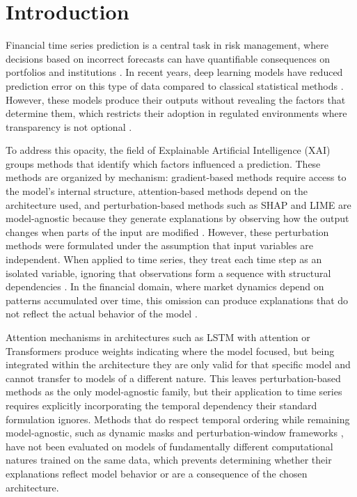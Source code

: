 \documentclass[runningheads]{llncs}
\begin{document}
\section{Introduction}
\label{sec:introduction}

Financial time series prediction is a central task in risk
management, where decisions based on incorrect forecasts can have
quantifiable consequences on portfolios and institutions
\cite{arsenault2025}. In recent years, deep learning models have
reduced prediction error on this type of data compared to classical
statistical methods \cite{bhandari2022,abdulquadir2023}. However,
these models produce their outputs without revealing the factors
that determine them, which restricts their adoption in regulated
environments where transparency is not optional \cite{arsenault2025}.

To address this opacity, the field of Explainable Artificial
Intelligence (XAI) groups methods that identify which factors
influenced a prediction. These methods are organized by mechanism:
gradient-based methods require access to the model's internal
structure, attention-based methods depend on the architecture used,
and perturbation-based methods such as SHAP and LIME are
model-agnostic because they generate explanations by observing how
the output changes when parts of the input are modified
\cite{arsenault2025}. However, these perturbation methods were
formulated under the assumption that input variables are
independent. When applied to time series, they treat each time step
as an isolated variable, ignoring that observations form a sequence
with structural dependencies \cite{tonekaboni2020,huang2025}. In
the financial domain, where market dynamics depend on patterns
accumulated over time, this omission can produce explanations that
do not reflect the actual behavior of the model
\cite{yadav2025,crabbe2021}.

Attention mechanisms in architectures such as LSTM with attention or
Transformers produce weights indicating where the model focused, but
being integrated within the architecture they are only valid for
that specific model and cannot transfer to models of a different
nature. This leaves perturbation-based methods as the only
model-agnostic family, but their application to time series requires
explicitly incorporating the temporal dependency their standard
formulation ignores. Methods that do respect temporal ordering while
remaining model-agnostic, such as dynamic masks \cite{crabbe2021} and
perturbation-window frameworks \cite{roshinta2026}, have not been
evaluated on models of fundamentally different computational natures
trained on the same data, which prevents determining whether their
explanations reflect model behavior or are a consequence of the
chosen architecture.
\end{document}
